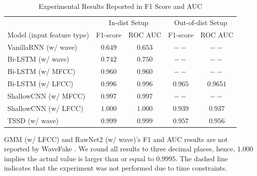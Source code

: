 \documentclass{article}
\begin{document}
\begin{table}[h!]
    \centering
    \vspace{2em}
    \caption{Experimental Results Reported in F1 Score and AUC}
    \begin{tabular}{lcccc}
        \toprule
                                               & \multicolumn{2}{c}{In-dist Setup} & \multicolumn{2}{c}{Out-of-dist Setup}                                        \\
        \cmidrule{2-3}                            \cmidrule{4-5} \rule{0pt}{2.2ex}
        Model (input feature type)             & F1-score                          & ROC AUC                               & F1-score         & ROC AUC           \\ \midrule
        \rule{0pt}{2.4ex} VanillaRNN (w/ wave) & $0.649$                           & $0.653$                               & $--$             & $--$              \\
        \rule{0pt}{2.4ex} Bi-LSTM (w/ wave)    & $0.742$                           & $0.750$                               & $--$             & $--$              \\
        \rule{0pt}{2.4ex} Bi-LSTM (w/ MFCC)    & $0.960$                           & $0.960$                               & $--$             & $--$              \\
        \rule{0pt}{2.4ex} Bi-LSTM (w/ LFCC)    & $0.996$                           & $0.996$                               & $\mathbf{0.965}$ & $\mathbf{0.9651}$ \\
        \rule{0pt}{2.4ex} ShallowCNN (w/ MFCC) & $0.997$                           & $0.997$                               & $--$             & $--$              \\
        \rule{0pt}{2.4ex} ShallowCNN (w/ LFCC) & $\mathbf{1.000}$                  & $\mathbf{1.000}$                      & $0.939$          & $0.937$           \\
        \rule{0pt}{2.4ex} TSSD (w/ wave)       & $0.999$                           & $0.999$                               & $0.957$          & $0.956$           \\
        \bottomrule
    \end{tabular}
    \begin{flushleft}
        \scriptsize{GMM (w/ LFCC) and RawNet2 (w/ wave)'s F1 and AUC results are not reported by WaveFake \cite{frank2021wavefake}. We round all results to three decimal places, hence, $1.000$ implies the actual value is larger than or equal to $0.9995$. The dashed line indicates that the experiment was not performed due to time constraints.}
    \end{flushleft}
    \vspace{-1em}
    \label{table:f1_auc}
\end{table}
\end{document}
